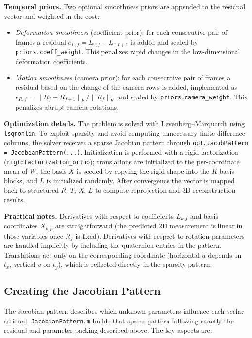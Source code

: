 \documentclass{article}
\begin{document}
\textbf{Temporal priors.} Two optional smoothness priors are appended to the residual vector and weighted in the cost:
\begin{itemize}
	\item \emph{Deformation smoothness} (coefficient prior): for each consecutive pair of frames a residual $e_{L,f}=L_{:,f}-L_{:,f+1}$ is added and scaled by \texttt{priors.coeff\_weight}. This penalizes rapid changes in the low-dimensional deformation coefficients.
	\item \emph{Motion smoothness} (camera prior): for each consecutive pair of frames a residual based on the change of the camera rows is added, implemented as $e_{R,f}=\|R_f-R_{f+1}\|_F / \|R_f\|_F$ and scaled by \texttt{priors.camera\_weight}. This penalizes abrupt camera rotations.
\end{itemize}

\textbf{Optimization details.} The problem is solved with Levenberg--Marquardt using \texttt{lsqnonlin}. To exploit sparsity and avoid computing unnecessary finite-difference columns, the solver receives a sparse Jacobian pattern through \texttt{opt.JacobPattern = JacobianPattern(...)}. Initialization is performed with a rigid factorization (\texttt{rigidfactorization\_ortho}); translations are initialized to the per-coordinate mean of $W$, the basis $X$ is seeded by copying the rigid shape into the $K$ basis blocks, and $L$ is initialized randomly. After convergence the vector is mapped back to structured $R$, $T$, $X$, $L$ to compute reprojection and 3D reconstruction results.

\textbf{Practical notes.} Derivatives with respect to coefficients $L_{k,f}$ and basis coordinates $X_{k,p}$ are straightforward (the predicted 2D measurement is linear in those variables once $R_f$ is fixed). Derivatives with respect to rotation parameters are handled implicitly by including the quaternion entries in the pattern. Translations act only on the corresponding coordinate (horizontal $u$ depends on $t_x$, vertical $v$ on $t_y$), which is reflected directly in the sparsity pattern.

\subsection{Creating the Jacobian Pattern}

The Jacobian pattern describes which unknown parameters influence each scalar residual. \texttt{JacobianPattern.m} builds that sparse pattern following exactly the residual and parameter packing described above. The key aspects are:
\end{document}
